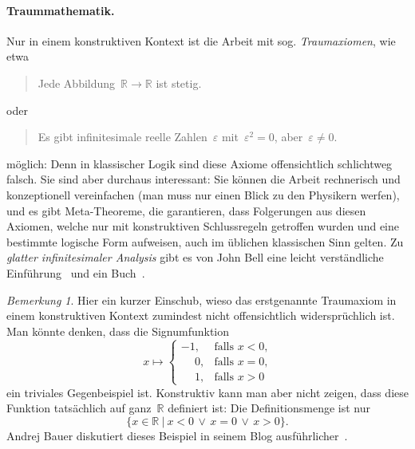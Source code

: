 \documentclass[a4paper,ngerman,12pt]{scrartcl}
\theoremstyle{definition}
\theoremstyle{plain}
\theoremstyle{remark}
\newtheorem{bem}[defn]{Bemerkung}
\newcommand{\RR}{\mathbb{R}}
\renewcommand{\_}{\mathpunct{.}\,}
\newcommand{\?}{\,{:}\,}
\begin{document}
\paragraph{Traummathematik.} Nur in einem konstruktiven Kontext ist die Arbeit
mit sog. \emph{Traum\-axio\-men}, wie etwa
\begin{quote}Jede Abbildung~$\RR \to \RR$ ist stetig.\end{quote}
oder
\begin{quote}Es gibt infinitesimale reelle Zahlen~$\varepsilon$
mit~$\varepsilon^2 = 0$, aber~$\varepsilon \neq 0$.\end{quote}
möglich: Denn in klassischer Logik sind diese Axiome offensichtlich schlichtweg
falsch. Sie sind aber durchaus interessant: Sie können die Arbeit
rechnerisch und konzeptionell vereinfachen (man muss nur einen Blick zu den
Physikern werfen), und es gibt Meta-Theoreme, die garantieren, dass Folgerungen
aus diesen Axiomen, welche nur mit konstruktiven Schlussregeln getroffen wurden
und eine bestimmte logische Form aufweisen, auch im üblichen klassischen Sinn
gelten. Zu \emph{glatter infinitesimaler Analysis} gibt es von John Bell eine
leicht verständliche Einführung~\cite{bell:invitation} und ein
Buch~\cite{bell:primer}.

\begin{bem}Hier ein kurzer Einschub, wieso das erstgenannte Traumaxiom
in einem konstruktiven Kontext zumindest nicht offensichtlich widersprüchlich
ist. Man könnte denken, dass die Signumfunktion
\[ x \longmapsto \begin{cases}
  -1, & \text{falls $x < 0$,} \\
  \phantom{+}0, & \text{falls $x = 0$,} \\
  \phantom{+}1, & \text{falls $x > 0$}
\end{cases} \]
ein triviales Gegenbeispiel ist. Konstruktiv kann man aber nicht zeigen, dass
diese Funktion tatsächlich auf ganz~$\RR$ definiert ist: Die Definitionsmenge
ist nur
\[ \{ x \in \RR \ |\  x < 0 \,\vee\, x = 0 \,\vee\, x > 0 \}. \]
Andrej Bauer diskutiert dieses Beispiel in seinem Blog
ausführlicher~\cite{bauer:blog:stetigkeit}.
\end{bem}
\end{document}
